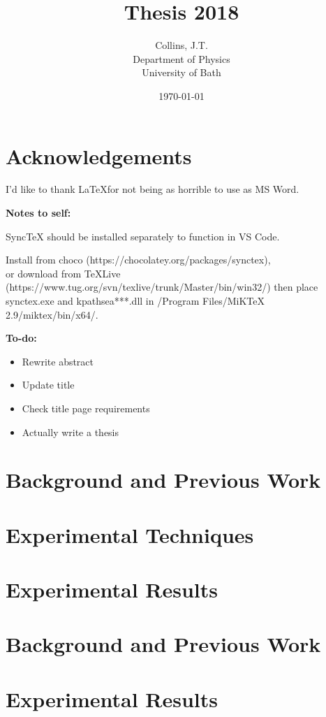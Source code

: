 \documentclass[11pt,a4paper,final]{report}
\title{Thesis 2018}
\author{
	Collins, J.T. \\ 
	Department of Physics\\
	University of Bath\\
}
\date{\today}
\begin{document}
\begin{titlepage}
    
\end{titlepage}

\clearpage
\tableofcontents
\clearpage

\begin{abstract}
    
\end{abstract}
\clearpage


\chapter*{Acknowledgements}
I'd like to thank \LaTeX  for not being as horrible to use as MS Word.

\noindent\textbf{Notes to self:}

\noindent SyncTeX should be installed separately to function in VS Code. 

\noindent Install from choco (https://chocolatey.org/packages/synctex), \\or download from TeXLive (https://www.tug.org/svn/texlive/trunk/Master/bin/win32/) then place synctex.exe and kpathsea***.dll in /Program Files/MiKTeX 2.9/miktex/bin/x64/.


\noindent\textbf{To-do:}
\begin{itemize}
	\item Rewrite abstract
	\item Update title
	\item Check title page requirements
    \item Actually write a thesis
\end{itemize}


\chapter{Background and Previous Work}\label{sec:background}



\chapter{Experimental Techniques}\label{sec:techniques}





\chapter{Experimental Results}\label{sec:results}








\clearpage

\appendix
\chapter{Background and Previous Work}\label{app:background}
\chapter{Experimental Results}\label{app:results}

\end{document}

